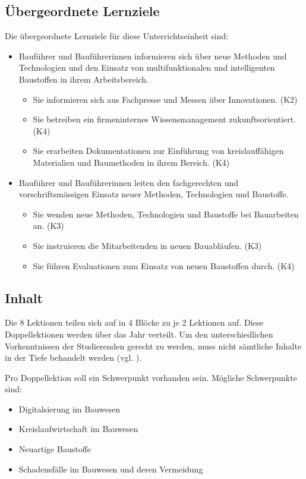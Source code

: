 \documentclass[
11pt,
captions=tableheading,
smallheadings,
headsepline,
footsepline, 
captions=tableheading,
parskip=half-,
]{scrartcl}
\begin{document}
\subsection{Übergeordnete Lernziele}
Die übergeordnete Lernziele für diese Unterrichtseinheit sind: 
\begin{itemize}
    \item Bauführer und Bauführerinnen informieren sich über neue Methoden und Technologien und den Einsatz von
    multifunktionalen und intelligenten Baustoffen in ihrem Arbeitsbereich.
    \begin{itemize}
        \item Sie informieren sich aus Fachpresse und Messen über Innovationen. (K2)
        \item Sie betreiben ein firmeninternes Wissensmanagement zukunftsorientiert. (K4)
        \item Sie erarbeiten Dokumentationen zur Einführung von kreislauffähigen Materialien und Baumethoden
        in ihrem Bereich. (K4)
    \end{itemize}
    \item Bauführer und Bauführerinnen leiten den fachgerechten und vorschriftsmässigen Einsatz neuer Methoden,
    Technologien und Baustoffe.
    \begin{itemize}
        \item Sie wenden neue Methoden, Technologien und Baustoffe bei Bauarbeiten an. (K3)
        \item Sie instruieren die Mitarbeitenden in neuen Bauabläufen. (K3)
        \item Sie führen Evaluationen zum Einsatz von neuen Baustoffen durch. (K4)
    \end{itemize}
\end{itemize}

\subsection{Inhalt}
Die 8 Lektionen teilen sich auf in 4 Blöcke zu je 2 Lektionen auf. 
Diese Doppellektionen werden über das Jahr verteilt.
Um den unterschiedlichen Vorkenntnissen der Studierenden gerecht zu werden, muss nicht sämtliche Inhalte in der Tiefe behandelt werden (vgl. ).


Pro Doppellektion soll ein Schwerpunkt vorhanden sein. 
Mögliche Schwerpunkte sind:
\begin{itemize}
    \item Digitalsierung im Bauwesen
    \item Kreislaufwirtschaft im Bauwesen
    \item Neuartige Baustoffe
    \item Schadensfälle im Bauwesen und deren Vermeidung
\end{itemize}
\end{document}
